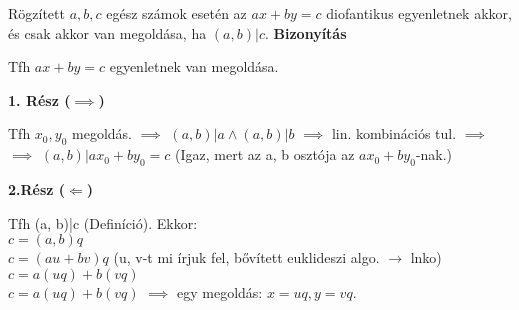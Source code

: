 \begin{frame}
  \begin{tcolorbox}[title={Tétel: A diofantikus egyenlet megoldása}]
    Rögzített $a, b, c$ egész számok esetén az \textbf{$ax + by = c$} diofantikus egyenletnek akkor, és csak akkor van megoldása, ha $(a, b)|c$.
  \tcblower
    \textbf{Bizonyítás}
    \mmedskip
    
    Tfh $ax + by = c$ egyenletnek van megoldása.\\
    \msmallskip
    
    \textbf{1. Rész ($\implies$)}\\
    \smallskip

    Tfh $x_0, y_0$ megoldás. $\implies$ $(a, b)|a \land (a, b)|b$ $\implies$ lin. kombinációs tul. $\implies$\\
    $\implies$ $(a, b)|ax_0 + by_0 = c$ (Igaz, mert az a, b osztója az $ax_0 + by_0$-nak.)\\
    \bigskip

    \textbf{2.Rész ($\Longleftarrow$)}\\
    \smallskip

    Tfh (a, b)|c (Definíció). Ekkor:\\
    $c = (a, b)q$\\
    $c = (au + bv)q$  (u, v-t mi írjuk fel, bővített euklideszi algo. $\rightarrow$ lnko)\\
    $c = a(uq) + b(vq)$\\
    $c = a(uq) + b(vq)$ $\implies$ egy megoldás: $x = uq, y = vq$.\\
  \end{tcolorbox}
\end{frame}

